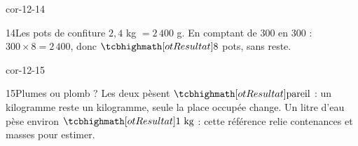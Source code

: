 \begin{blocLivre}{cor-12-14}\begin{corrige}{14}{Les pots de confiture}
$2{,}4$ kg $=2\,400$ g. En comptant de 300 en 300 : $300\times8=2\,400$, donc $\res8$ pots, sans reste.
\end{corrige}\end{blocLivre}
\begin{blocLivre}{cor-12-15}\begin{corrige}{15}{Plumes ou plomb ?}
Les deux pèsent $\res{\text{pareil}}$ : un kilogramme reste un kilogramme, seule la place occupée change. Un litre d’eau pèse environ $\res{1\ \mathrm{kg}}$ : cette référence relie contenances et masses pour estimer.
\end{corrige}\end{blocLivre}
